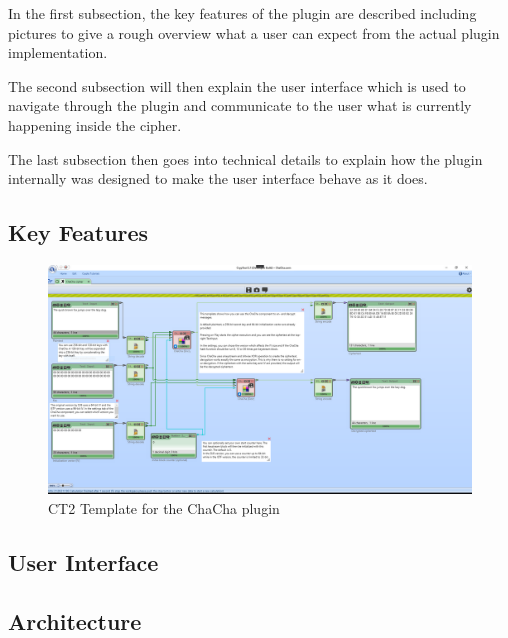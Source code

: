 In the first subsection, the key features of the plugin are described including pictures to give a rough overview what a user can expect from the actual plugin implementation.

\par

The second subsection will then explain the user interface which is used to navigate through the plugin and communicate to the user what is currently happening inside the cipher.

\par

The last subsection then goes into technical details to explain how the plugin internally was designed to make the user interface behave as it does.


\subsection{Key Features}
\label{sec:keyFeatures}

\begin{figure}
\caption{CT2 Template for the ChaCha plugin}
\label{plugin.template}
\includegraphics[width=\textwidth]{figures/plugin-template.png}
\end{figure}
\blindtext[2]

\subsection{User Interface}
\label{sec:userInterface}

\blindtext[8]

\subsection{Architecture}
\label{sec:Architecture}

